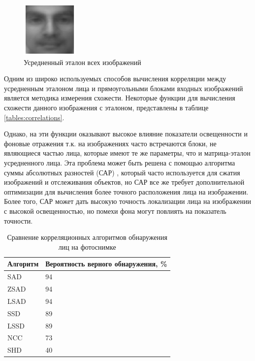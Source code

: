 \begin{figure}[hbt!]
    \centering
    \includegraphics{average_persons.png}
    \caption{Усредненный эталон всех изображений}
    \label{fig:average_persons}
\end{figure}

Одним из широко используемых способов вычисления корреляции между усредненным эталоном лица и прямоугольными блоками входных
изображений является методика измерения схожести\cite{kvantic}. Некоторые функции для вычисления схожести данного изображения
с эталоном, представлены в таблице \ref{tables:correlations}.

Однако, на эти функции оказывают высокое влияние показатели освещенности и фоновые отражения т.к. на изображениях часто
встречаются блоки, не являющиеся частью лица, которые имеют те же параметры, что и матрица-эталон усредненного лица. Эта проблема
может быть решена с помощью алгоритма суммы абсолютных разностей (САР) \cite{sar}, который часто используется для сжатия изображений и
отслеживания объектов, но САР все же требует дополнительной оптимизации для вычисления более точного расположения лица на
изображении. Более того, САР может дать высокую точность локализации лица на изображении с высокой освещенностью, но помехи фона
могут повлиять на показатель точности. 

\begin{table}[bth]
    \centering
    \begin{tabu}{|X[c]|X[c]|}
        \hline
        Алгоритм & Вероятность верного обнаружения, \% \\
        \hline
        SAD & 94 \\
        \hline
        ZSAD & 94 \\
        \hline
        LSAD & 94 \\
        \hline
        SSD & 89 \\
        \hline
        LSSD & 89 \\
        \hline
        NCC & 73 \\
        \hline
        SHD & 40 \\
        \hline
    \end{tabu}
    \captionsetup{justification=centering}
    \caption{Сравнение корреляционных алгоритмов обнаружения лиц на фотоснимке}
    \label{tables:corr_results}
\end{table}

